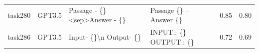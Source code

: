 \begin{longtable}{@{}p{0.8cm\tiny}p{1cm\tiny}p{4.1cm\ttfamily\tiny}p{4.1cm\ttfamily\tiny}p{0.8cm\tiny}p{0.8cm\tiny}@{}}
task280   & GPT3.5    & Passage - \{\} \textless{}sep\textgreater Answer - \{\}                                                                                                                                                                                                                                                                                                                                                                                                                                                                 & Passage \{\} -- Answer \{\}                                                                                                                                                                                                                                                                                                                                                                                                                                                                                                                                                       & 0.85 & 0.80 \\
task286   & GPT3.5    & Input- \{\}\textbackslash{}n Output- \{\}                                                                                                                                                                                                                                                                                                                                                                                                                                                                               & INPUT:: \{\} OUTPUT:: \{\}                                                                                                                                                                                                                                                                                                                                                                                                                                                                                                                                                        & 0.72 & 0.69 \\

\end{longtable}
